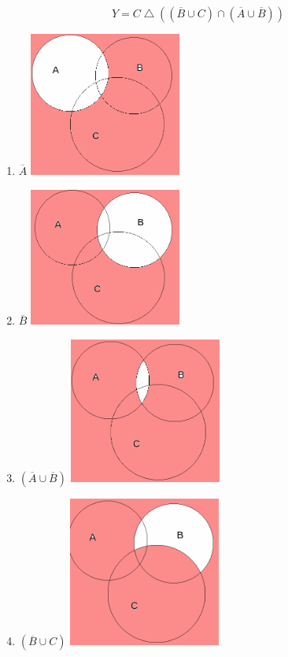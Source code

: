 \documentclass{article}
\begin{document}
\noindent\makebox[\linewidth]{\rule{\paperwidth}{0.4pt}}

$$Y = C \bigtriangleup ((\overline{B} \cup C) \cap (\overline{A} \cup \overline{B}))$$

\begin{enumerate}
    \item $\overline{A}$
    \includegraphics[width=50mm]{7.png}
    
    \item $\overline{B}$
    \includegraphics[width=50mm]{8.png}
    
    \item $(\overline{A} \cup \overline{B})$
    \includegraphics[width=50mm]{9.png}
    
    \item $(\overline{B} \cup C)$
    \includegraphics[width=50mm]{10.png}


\end{enumerate}
\end{document}
